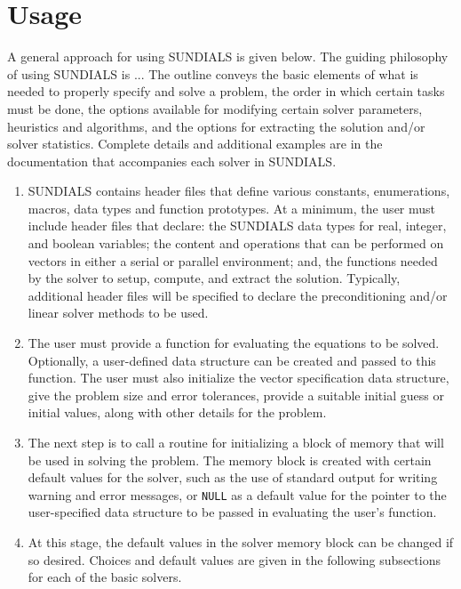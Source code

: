\section{Usage} 
\label{s:usage}

A general approach for using SUNDIALS is given below. 
{\sf The guiding philosophy of using SUNDIALS is ...}
The outline conveys the basic elements of what is needed to properly
specify and solve a problem, the order in which certain tasks must be
done, the options available for modifying certain solver parameters,
heuristics and algorithms, and the options for extracting the solution
and/or solver statistics.
Complete details and additional examples are in the documentation that
accompanies each solver in SUNDIALS.

\begin{enumerate}

\item \label{sun_headers}
SUNDIALS contains header files that define various constants,
enumerations, macros, data types and function prototypes.  At a
minimum, the user must include header files that declare: the SUNDIALS
data types for real, integer, and boolean variables; the content and
operations that can be performed on vectors in either a serial or
parallel environment; and, the functions needed by the solver to
setup, compute, and extract the solution. Typically, additional header
files will be specified to declare the preconditioning and/or linear
solver methods to be used.

\item \label{sun_problem}
The user must provide a function for evaluating the equations to be
solved. Optionally, a user-defined data structure can be created and
passed to this function. The user must also initialize the vector
specification data structure, give the problem size and error
tolerances, provide a suitable initial guess or initial values, along
with other details for the problem.

\item \label{sun_create}
The next step is to call a routine for initializing a block of memory
that will be used in solving the problem. The memory block is created
with certain default values for the solver, such as the use of
standard output for writing warning and error messages, or {\tt NULL}
as a default value for the pointer to the user-specified data
structure to be passed in evaluating the user's function.

\item \label{sun_set}
At this stage, the default values in the solver memory block can be
changed if so desired. Choices and default values are given in the
following subsections for each of the basic solvers.


\end{enumerate}

